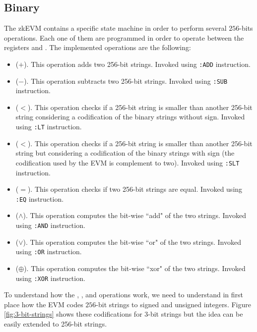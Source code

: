 \subsection{Binary} \label{sec:binary-sm}

The zkEVM contains a specific state machine in order to perform several $256$-bits operations. Each one of them are programmed in order to operate between the registers \A and \B. The implemented operations are the following:

\begin{itemize}
    
    \item \ADD ($+$). This operation adds two 256-bit strings. Invoked using \texttt{:ADD} instruction. 
    
    \item \SUB ($-$). This operation subtracts two 256-bit strings. Invoked using \texttt{:SUB} instruction. 
    
    \item \LT ($<$). This operation checks if a 256-bit string is smaller than another 256-bit string considering a codification of the binary strings without sign. Invoked using \texttt{:LT} instruction. 
    
    \item \SLT ($<$). This operation checks if a 256-bit string is smaller than another 256-bit string but considering a codification of the binary strings with sign (the codification used by the EVM is complement to two). Invoked using \texttt{:SLT} instruction. 
    
    \item \EQ ($=$). This operation checks if two 256-bit strings are equal. Invoked using \texttt{:EQ} instruction. 
    
    \item \AND ($\land$). This operation computes the bit-wise ``add" of the two strings. Invoked using \texttt{:AND} instruction. 
    
    \item \OR ($\lor$). This operation computes the bit-wise ``or" of the two strings. Invoked using \texttt{:OR} instruction. 
    
    \item \XOR ($\oplus$). This operation computes the bit-wise ``xor" of the two strings. Invoked using \texttt{:XOR} instruction. 
    
\end{itemize}

To understand how the \ADD, \SUB, \LT and \SLT operations work, we need to understand in first place how the EVM codes $256$-bit strings to signed and unsigned integers. Figure \ref{fig:3-bit-strings} shows these codifications for 3-bit strings but the idea can be easily extended to 256-bit strings.

